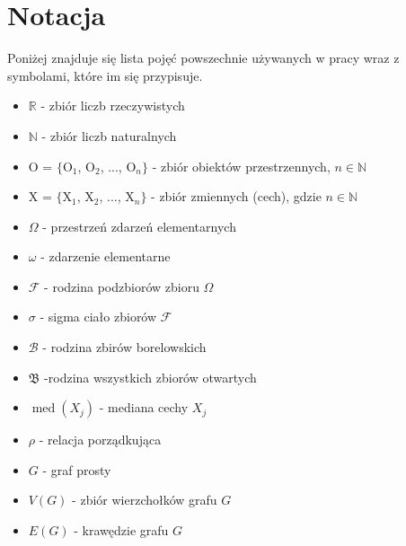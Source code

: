 \documentclass[12pt,a4paper]{report}
\newcommand{\mediana}{\operatorname{med}}
\newcommand{\licznosc}[1]{\overline{\overline{#1}}}
\begin{document}
\section{Notacja} 
\noindent

Poniżej znajduje się lista pojęć powszechnie używanych w pracy wraz z symbolami, które im się przypisuje. 
  
\begin{itemize}
\item $\mathbb{R}$ - zbiór liczb rzeczywistych
\item $\mathbb{N}$ - zbiór liczb naturalnych
\item O = $\{$O$_{1}$, O$_{2}$, ..., O$_{n}\}$ - zbiór obiektów przestrzennych, $n \in \mathbb{N}$
\item X = $\{$X$_{1}$, X$_{2}$, ..., X$_{n}\}$ - zbiór zmiennych (cech), gdzie $n \in \mathbb{N}$
\item $\Omega$ - przestrzeń zdarzeń elementarnych
\item $\omega$ - zdarzenie elementarne 
\item $\mathcal{F}$ - rodzina podzbiorów zbioru $\Omega$
\item $\sigma$ -  sigma ciało zbiorów $\mathcal{F}$
\item $\mathcal{B}$ - rodzina zbirów borelowskich
\item $\mathfrak{B}$ -rodzina wszystkich zbiorów otwartych %
\item $\mediana (X_{j})$ - mediana cechy $X_{j}$
\item $\rho$ - relacja porządkująca
\item $G$ - graf prosty
\item $V(G)$ - zbiór wierzchołków grafu $G$
\item $E(G)$ - krawędzie grafu $G$


\end{itemize}
\newpage
\end{document}
